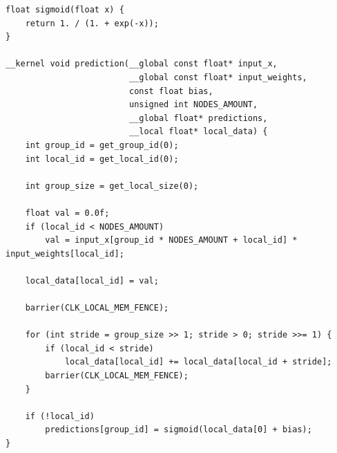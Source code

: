 \documentclass[a4paper,14pt]{extarticle}
\begin{document}
\begin{verbatim}
float sigmoid(float x) {
    return 1. / (1. + exp(-x));
}

__kernel void prediction(__global const float* input_x,
                         __global const float* input_weights,
                         const float bias,
                         unsigned int NODES_AMOUNT,
                         __global float* predictions,
                         __local float* local_data) {
    int group_id = get_group_id(0);
    int local_id = get_local_id(0);
    
    int group_size = get_local_size(0);

    float val = 0.0f;
    if (local_id < NODES_AMOUNT) 
        val = input_x[group_id * NODES_AMOUNT + local_id] * input_weights[local_id];
    
    local_data[local_id] = val;

    barrier(CLK_LOCAL_MEM_FENCE);
    
    for (int stride = group_size >> 1; stride > 0; stride >>= 1) {
        if (local_id < stride)
            local_data[local_id] += local_data[local_id + stride];
        barrier(CLK_LOCAL_MEM_FENCE);
    }

    if (!local_id) 
        predictions[group_id] = sigmoid(local_data[0] + bias);
}
\end{verbatim}
\end{document}
